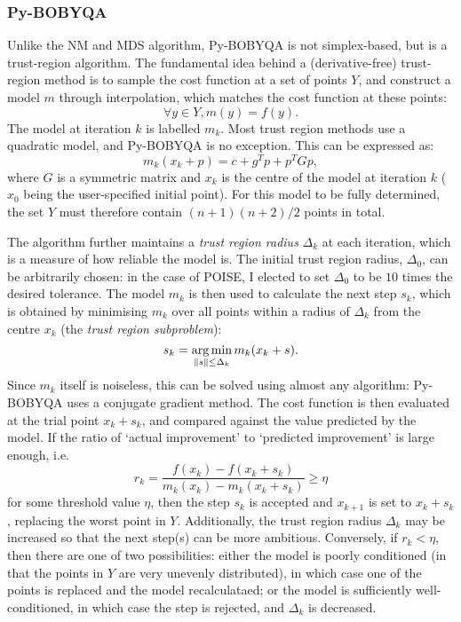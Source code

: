 \subsubsection{Py-BOBYQA}

Unlike the NM and MDS algorithm, Py-BOBYQA is not simplex-based, but is a trust-region algorithm.\autocite{Powell2009Proc,Cartis2019ACMTMS}
The fundamental idea behind a (derivative-free) trust-region method is to sample the cost function at a set of points $Y$, and construct a model $m$ through interpolation, which matches the cost function at these points:
\begin{equation}
    \label{eq:trust_region_model}
    \forall y \in Y, m(y) = f(y).
\end{equation}
The model at iteration $k$ is labelled $m_k$.
Most trust region methods use a quadratic model, and Py-BOBYQA is no exception.
This can be expressed as:
\begin{equation}
    \label{eq:trust_region_quadratic_model}
    m_k(x_k + p) = c + g^Tp + p^TGp,
\end{equation}
where $G$ is a symmetric matrix and $x_k$ is the centre of the model at iteration $k$ ($x_0$ being the user-specified initial point).
For this model to be fully determined, the set $Y$ must therefore contain $(n+1)(n+2)/2$ points in total.

The algorithm further maintains a \textit{trust region radius} $\Delta_k$ at each iteration, which is a measure of how reliable the model is.
The initial trust region radius, $\Delta_0$, can be arbitrarily chosen: in the case of POISE, I elected to set $\Delta_0$ to be $10$ times the desired tolerance.
The model $m_k$ is then used to calculate the next step $s_k$, which is obtained by minimising $m_k$ over all points within a radius of $\Delta_k$ from the centre $x_k$ (the \textit{trust region subproblem}):
\begin{equation}
    \label{eq:trust_region_subproblem}
    s_k = \operatorname*{arg\,min}_{\lVert s \rVert \leq \Delta_k} m_k(x_k + s).
\end{equation}
Since $m_k$ itself is noiseless, this can be solved using almost any algorithm: Py-BOBYQA uses a conjugate gradient method.
The cost function is then evaluated at the trial point $x_k + s_k$, and compared against the value predicted by the model.
If the ratio of `actual improvement' to `predicted improvement' is large enough, i.e.
\begin{equation}
    \label{eq:trust_region_threshold}
    r_k = \frac{f(x_k) - f(x_k + s_k)}{m_k(x_k) - m_k(x_k + s_k)} \geq \eta
\end{equation}
for some threshold value $\eta$, then the step $s_k$ is accepted and $x_{k+1}$ is set to $x_k + s_k$, replacing the worst point in $Y$.
Additionally, the trust region radius $\Delta_k$ may be increased so that the next step(s) can be more ambitious.
Conversely, if $r_k < \eta$, then there are one of two possibilities: either the model is poorly conditioned (in that the points in $Y$ are very unevenly distributed), in which case one of the points is replaced and the model recalculataed; or the model is sufficiently well-conditioned, in which case the step is rejected, and $\Delta_k$ is decreased.

